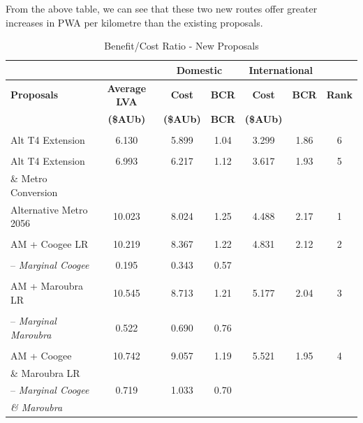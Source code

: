 \documentclass[preprint,12pt,authoryear]{elsarticle}
\begin{document}
From the above table, we can see that these two new routes offer greater increases in PWA per kilometre than the existing proposals.

\begin{table}[H]
\centering
 
\caption{Benefit/Cost Ratio - New Proposals}\label{bcr new}

\begin{tabular}{p{4cm}cccccc}
    \toprule 
    & &\multicolumn{2}{c}{\textbf{Domestic}}& \multicolumn{2}{c}{\textbf{International}}&\\
    \midrule

    \textbf{Proposals}& \textbf{Average LVA }& \textbf{Cost}& \textbf{BCR}& \textbf{Cost }& \textbf{BCR}& \textbf{Rank}\\
 & \textbf{ (\$AUb)}& \textbf{(\$AUb)}& \textbf{BCR}& \textbf{(\$AUb)}& &\\
    \midrule
 & & & & & & \\
 Alt T4 Extension& 6.130& 5.899& 1.04& 3.299& 1.86
&6\\
 & & & & & &\\
 Alt T4 Extension & 6.993& 6.217& 1.12& 3.617& 1.93
& 5
\\
 \& Metro Conversion& 
& 
& 

& 

& 


&

\\
 Alternative Metro 2056
& 10.023& 8.024& 1.25& 4.488
& 
2.17
&
1
\\
 & 
& 
& 
& 

& 


&

\\
 AM + Coogee LR
& 10.219& 

8.367& 
1.22& 
4.831& 

2.12
&

2
\\
 & & & & 
& 
&
\\
-- \textit{Marginal Coogee }
& 0.195& 
0.343
& 0.57& 
& 
&
\\
 & & 
& & 
& 
&
\\
 AM + Maroubra LR
& 10.545& 

8.713& 1.21& 5.177& 2.04
&3
\\
 & & & & 
& 
&
\\
-- \textit{Marginal Maroubra}
& 0.522& 0.690& 0.76
& 
& 
&
\\
 & & & & 
& 
&
\\
 AM + Coogee & 10.742& 9.057& 1.19& 5.521& 1.95
&4
\\
 \& Maroubra LR& & & & 
& &
\\
-- \textit{Marginal Coogee} & 0.719& 1.033& 0.70
& & &\\
 \textit{\& Maroubra}& & & & & &\\
 \bottomrule
\end{tabular}
\end{table}
\end{document}
